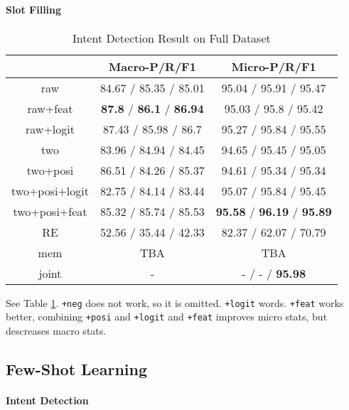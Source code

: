 \paragraph{Slot Filling}
\begin{table}
\setlength{\tabcolsep}{0.23em}
\centering
\small{
\begin{tabular}{|c|c|c|}

\hline
  & Macro-P/R/F1 & Micro-P/R/F1  \\
\hline
raw &  84.67 / 85.35 / 85.01            & 95.04 / 95.91 / 95.47  \\
\hline
raw+feat & \textbf{87.8} / \textbf{86.1} / \textbf{86.94} & 95.03 / 95.8 / 95.42  \\
\hline
raw+logit & 87.43 / 85.98 / 86.7        & 95.27 / 95.84 / 95.55  \\
\hline
two & 83.96 / 84.94 / 84.45             & 94.65 / 95.45 / 95.05 \\
\hline
two+posi & 86.51 / 84.26 / 85.37        & 94.61 / 95.34 / 95.34  \\
\hline
two+posi+logit & 82.75 / 84.14 / 83.44  & 95.07 / 95.84 / 95.45 \\
\hline
two+posi+feat & 85.32 / 85.74 / 85.53   & \textbf{95.58} / \textbf{96.19} / \textbf{95.89} \\
\hline
\hline
RE & 52.56 / 35.44 / 42.33 & 82.37 / 62.07 / 70.79 \\
\hline
mem & TBA & TBA \\
\hline
joint & - & - / - / \textbf{95.98} \\
\hline 

\end{tabular}
}
\caption{Intent Detection Result on Full Dataset}
\label{tab_slot_full}
\end{table}

See Table \ref{tab_slot_full}.
\texttt{+neg} does not work, so it is omitted.
\texttt{+logit} words. \texttt{+feat} works better, combining \texttt{+posi} and \texttt{+logit} and \texttt{+feat} improves micro stats, but descreases macro stats.



\subsection{Few-Shot Learning}
\paragraph{Intent Detection}

